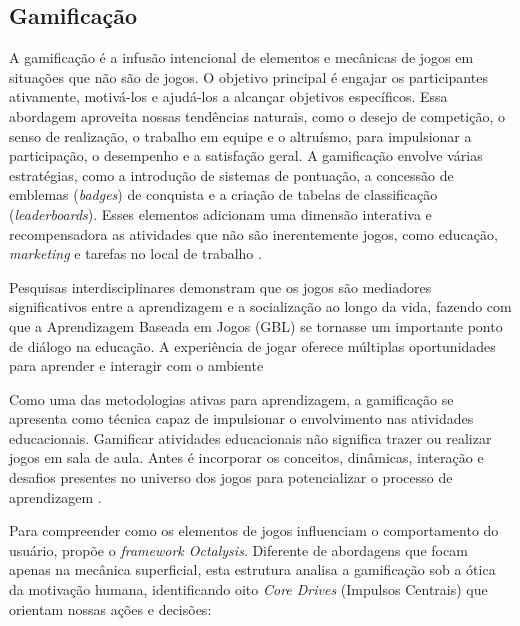 \subsection[Gamificação]{Gamificação}
\label{sec:gamificacao}

A gamificação é a infusão intencional de elementos e mecânicas de jogos em situações que não são de jogos. O objetivo principal é engajar os participantes ativamente, motivá-los e ajudá-los a alcançar objetivos específicos. Essa abordagem aproveita nossas tendências naturais, como o desejo de competição, o senso de realização, o trabalho em equipe e o altruísmo, para impulsionar a participação, o desempenho e a satisfação geral. A gamificação envolve várias estratégias, como a introdução de sistemas de pontuação, a concessão de emblemas (\textit{badges}) de conquista e a criação de tabelas de classificação (\textit{leaderboards}). Esses elementos adicionam uma dimensão interativa e recompensadora as atividades que não são inerentemente jogos, como educação, \textit{marketing} e tarefas no local de trabalho \cite{deliyannis2023gamification}.

Pesquisas interdisciplinares demonstram que os jogos são mediadores significativos entre a aprendizagem e a socialização ao longo da vida, fazendo com que a Aprendizagem Baseada em Jogos (GBL) se tornasse um importante ponto de diálogo na educação. A experiência de jogar oferece múltiplas oportunidades para aprender e interagir com o ambiente \cite{magtani2024design}

Como uma das metodologias ativas para aprendizagem, a gamificação se apresenta como técnica capaz de impulsionar o envolvimento nas atividades educacionais. Gamificar atividades educacionais não significa trazer ou realizar jogos em sala de aula. Antes é incorporar os conceitos, dinâmicas, interação e desafios presentes no universo dos jogos para potencializar o processo de aprendizagem \cite{souza2025metodologias}.

Para compreender como os elementos de jogos influenciam o comportamento do usuário,  propõe o \textit{framework Octalysis}. Diferente de abordagens que focam apenas na mecânica superficial, esta estrutura analisa a gamificação sob a ótica da motivação humana, identificando oito \textit{Core Drives} (Impulsos Centrais) que orientam nossas ações e decisões:

